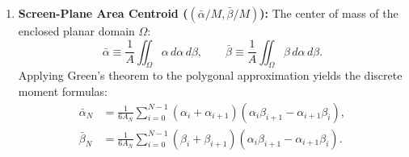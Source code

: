 \begin{enumerate}[label=(\roman*)]
    \item \textbf{Screen-Plane Area Centroid ($(\bar{\alpha}/M, \bar{\beta}/M)$):}  
    The center of mass of the enclosed planar domain $\Omega$:
    \begin{equation}
        \bar{\alpha} \equiv \frac{1}{A} \iint_\Omega \alpha\,d\alpha\,d\beta, \qquad
        \bar{\beta} \equiv \frac{1}{A} \iint_\Omega \beta\,d\alpha\,d\beta.
        \label{eq:centroid_def}
    \end{equation}
    Applying Green's theorem to the polygonal approximation yields the discrete moment formulas:
    \begin{align}
        \bar{\alpha}_N &= \frac{1}{6A_N} \sum_{i=0}^{N-1} (\alpha_i + \alpha_{i+1}) \left( \alpha_i \beta_{i+1} - \alpha_{i+1} \beta_i \right), \label{eq:centroid_alpha_poly} \\
        \bar{\beta}_N  &= \frac{1}{6A_N} \sum_{i=0}^{N-1} (\beta_i + \beta_{i+1}) \left( \alpha_i \beta_{i+1} - \alpha_{i+1} \beta_i \right). \label{eq:centroid_beta_poly}
    \end{align}
\end{enumerate}

